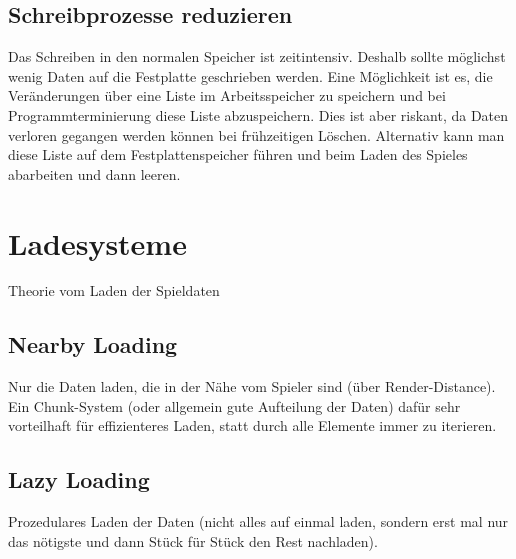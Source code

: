 \subsection{Schreibprozesse reduzieren}
Das Schreiben in den normalen Speicher ist zeitintensiv. Deshalb sollte möglichst wenig Daten auf die Festplatte geschrieben werden. Eine Möglichkeit ist es, die Veränderungen über eine Liste im Arbeitsspeicher zu speichern und bei Programmterminierung diese Liste abzuspeichern. Dies ist aber riskant, da Daten verloren gegangen werden können bei frühzeitigen Löschen. Alternativ kann man diese Liste auf dem Festplattenspeicher führen und beim Laden des Spieles abarbeiten und dann leeren.




\section{Ladesysteme}\label{sect:ladesysteme}
Theorie vom Laden der Spieldaten


\subsection{Nearby Loading} \label{ssect:nearbLoading}
Nur die Daten laden, die in der Nähe vom Spieler sind (über Render-Distance). Ein Chunk-System (oder allgemein gute Aufteilung der Daten) dafür sehr vorteilhaft für effizienteres Laden, statt durch alle Elemente immer zu iterieren.


\subsection{Lazy Loading}
Prozedulares Laden der Daten (nicht alles auf einmal laden, sondern erst mal nur das nötigste und dann Stück für Stück den Rest nachladen). 


